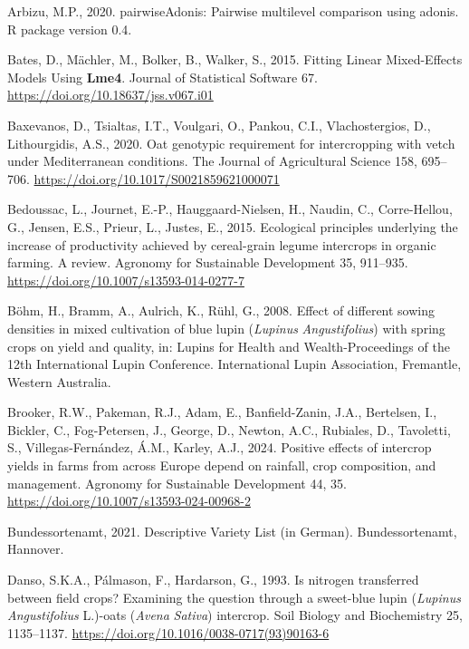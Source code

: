 \documentclass[
  british,
  a4paper,
  DIV=11,
  numbers=noendperiod]{scrreprt}
\newlength{\cslhangindent}
\newenvironment{CSLReferences}[2] %
 {\begin{list}{}{%
  \setlength{\itemindent}{0pt}
  \setlength{\leftmargin}{0pt}
  \setlength{\parsep}{0pt}
  \ifodd #1
   \setlength{\leftmargin}{\cslhangindent}
   \setlength{\itemindent}{-1\cslhangindent}
  \fi
  \setlength{\itemsep}{#2\baselineskip}}}
 {\end{list}}
\begin{document}
\label{refs}
\begin{CSLReferences}{1}{0}
Arbizu, M.P., 2020. {pairwiseAdonis}: {Pairwise} multilevel comparison
using adonis. {R} package version 0.4.

Bates, D., Mächler, M., Bolker, B., Walker, S., 2015. Fitting {Linear
Mixed-Effects Models Using} {\textbf{Lme4}}. Journal of Statistical
Software 67. \url{https://doi.org/10.18637/jss.v067.i01}

Baxevanos, D., Tsialtas, I.T., Voulgari, O., Pankou, C.I.,
Vlachostergios, D., Lithourgidis, A.S., 2020. Oat genotypic requirement
for intercropping with vetch under {Mediterranean} conditions. The
Journal of Agricultural Science 158, 695--706.
\url{https://doi.org/10.1017/S0021859621000071}

Bedoussac, L., Journet, E.-P., Hauggaard-Nielsen, H., Naudin, C.,
Corre-Hellou, G., Jensen, E.S., Prieur, L., Justes, E., 2015. Ecological
principles underlying the increase of productivity achieved by
cereal-grain legume intercrops in organic farming. {A} review. Agronomy
for Sustainable Development 35, 911--935.
\url{https://doi.org/10.1007/s13593-014-0277-7}

Böhm, H., Bramm, A., Aulrich, K., Rühl, G., 2008. Effect of different
sowing densities in mixed cultivation of blue lupin ({\emph{Lupinus}}{
\emph{Angustifolius}}) with spring crops on yield and quality, in:
Lupins for {Health} and {Wealth-Proceedings} of the 12th {International
Lupin Conference}. International Lupin Association, Fremantle, Western
Australia.

Brooker, R.W., Pakeman, R.J., Adam, E., Banfield-Zanin, J.A., Bertelsen,
I., Bickler, C., Fog-Petersen, J., George, D., Newton, A.C., Rubiales,
D., Tavoletti, S., Villegas-Fernández, Á.M., Karley, A.J., 2024.
Positive effects of intercrop yields in farms from across {Europe}
depend on rainfall, crop composition, and management. Agronomy for
Sustainable Development 44, 35.
\url{https://doi.org/10.1007/s13593-024-00968-2}

Bundessortenamt, 2021. Descriptive {Variety List} (in {German}).
Bundessortenamt, Hannover.

Danso, S.K.A., Pálmason, F., Hardarson, G., 1993. Is nitrogen
transferred between field crops? Examining the question through a
sweet-blue lupin ({\emph{Lupinus}}{ \emph{Angustifolius}} {L}.)-oats
({\emph{Avena}}{ \emph{Sativa}}) intercrop. Soil Biology and
Biochemistry 25, 1135--1137.
\url{https://doi.org/10.1016/0038-0717(93)90163-6}


\end{CSLReferences}
\end{document}
